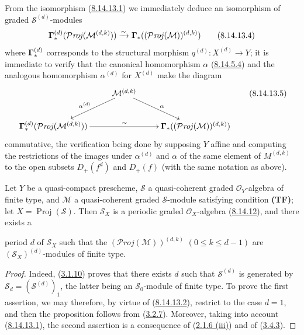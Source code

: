 \begin{remark}[8.14.13]
From the isomorphism (\hyperref[II.8.14.13.1]{8.14.13.1}) we immediately
deduce an isomorphism of graded $\mathcal{S}^{(d)}$-modules
\begin{equation}
\label{II.8.14.13.4}
  \boldsymbol{\Gamma}_*^{(d)}(\mathcal{P}\mathit{roj}(\mathcal{M}^{(d,k)}))
  \xrightarrow{\sim}
  \boldsymbol{\Gamma}_*((\mathcal{P}\mathit{roj}(\mathcal{M}))^{(d,k)})
\tag{8.14.13.4}
\end{equation}
where $\boldsymbol{\Gamma}_*^{(d)}$ corresponds to the structural morphism
$q^{(d)}:X^{(d)}\to Y$; it is immediate to verify that the canonical
homomorphism $\alpha$ (\hyperref[II.8.14.5.4]{8.14.5.4}) and the
analogous homomorphism $\alpha^{(d)}$ for $X^{(d)}$ make the diagram
\begin{equation}
\label{II.8.14.13.5}
  \xymatrix{
    & \mathcal{M}^{(d,k)}\ar[dl]_{\alpha^{(d)}}\ar[dr]^{\alpha} & \\
    \bbGamma_*^{(d)}(\mathcal{P}\mathit{roj}(\mathcal{M}^{(d,k)}))
      \ar[rr]^{\sim}
      && \bbGamma_*((\mathcal{P}\mathit{roj}(\mathcal{M}))^{(d,k)})
  }
\tag{8.14.13.5}
\end{equation}
commutative, the verification being done by supposing $Y$ affine and
computing the restrictions of the images under $\alpha^{(d)}$ and $\alpha$ of
the same element of $M^{(d,k)}$ to the open subsets $D_+(f^d)$ and $D_+(f)$
(with the same notation as above).
\end{remark}

\begin{proposition}[8.14.14]
\label{II.8.14.14}
Let $Y$ be a quasi-compact prescheme, $\mathcal{S}$ a quasi-coherent graded
$\mathcal{O}_Y$-algebra of finite type, and $\mathcal{M}$ a quasi-coherent
graded $\mathcal{S}$-module satisfying condition
\textup{\textbf{(TF)}}; let $X=\operatorname{Proj}(\mathcal{S})$. Then
$\mathcal{S}_X$ is a periodic graded $\mathcal{O}_X$-algebra
\textup{(\hyperref[II.8.14.12]{8.14.12})}, and there exists a

period $d$ of $\mathcal{S}_X$ such that the
$(\mathcal{P}\mathit{roj}(\mathcal{M}))^{(d,k)}$
$(0\leqslant k\leqslant d-1)$ are
$(\mathcal{S}_X)^{(d)}$-modules of finite type.
\end{proposition}

\begin{proof}
Indeed, (\hyperref[II.3.1.10]{3.1.10}) proves that there exists $d$ such
that $\mathcal{S}^{(d)}$ is generated by
$\mathcal{S}_d=(\mathcal{S}^{(d)})_1$, the latter being an
$\mathcal{S}_0$-module of finite type. To prove the first assertion, we
may therefore, by virtue of (\hyperref[II.8.14.13.2]{8.14.13.2}), restrict
to the case $d=1$, and then the proposition follows from
(\hyperref[II.3.2.7]{3.2.7}). Moreover, taking into account
(\hyperref[II.8.14.13.1]{8.14.13.1}), the second assertion is a consequence
of (\hyperref[II.2.1.6]{2.1.6 (iii)}) and of
(\hyperref[II.3.4.3]{3.4.3}).
\end{proof}
